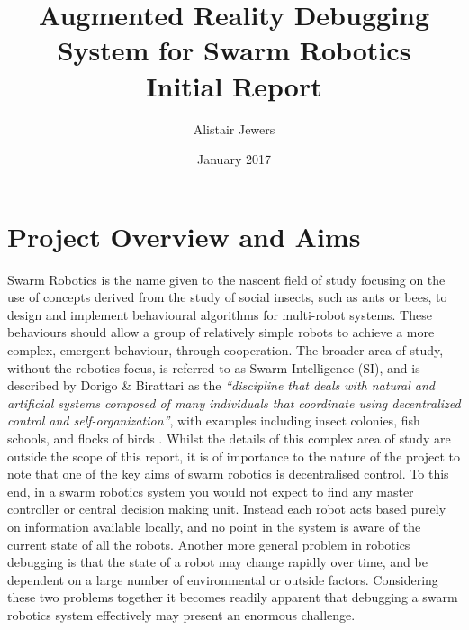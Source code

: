 \documentclass[titlepage,hidelinks,10pt]{article}
\date{January 2017}
\title{Augmented Reality Debugging System for Swarm Robotics \vspace{1cm}\\\Large{Initial Report}}
\author{Alistair Jewers}
\begin{document}
\maketitle

\tableofcontents
\newpage



\section{Project Overview and Aims}
Swarm Robotics is the name given to the nascent field of study focusing on the use of concepts derived from the study of social insects, such as ants or bees, to design and implement behavioural algorithms for multi-robot systems. These behaviours should allow a group of relatively simple robots to achieve a more complex, emergent behaviour, through cooperation\cite{SwarmRoboticsDefinition}. The broader area of study, without the robotics focus, is referred to as Swarm Intelligence (SI), and is described by Dorigo \& Birattari as the \textit{``discipline that deals with natural and artificial systems composed of many individuals that coordinate using decentralized control and self-organization''}, with examples including insect colonies, fish schools, and flocks of birds \cite{SwarmIntelligence}. Whilst the details of this complex area of study are outside the scope of this report, it is of importance to the nature of the project to note that one of the key aims of swarm robotics is decentralised control. To this end, in a swarm robotics system you would not expect to find any master controller or central decision making unit. Instead each robot acts based purely on information available locally, and no point in the system is aware of the current state of all the robots. Another more general problem in robotics debugging is that the state of a robot may change rapidly over time, and be dependent on a large number of environmental or outside factors. Considering these two problems together it becomes readily apparent that debugging a swarm robotics system effectively may present an enormous challenge. 
\end{document}
